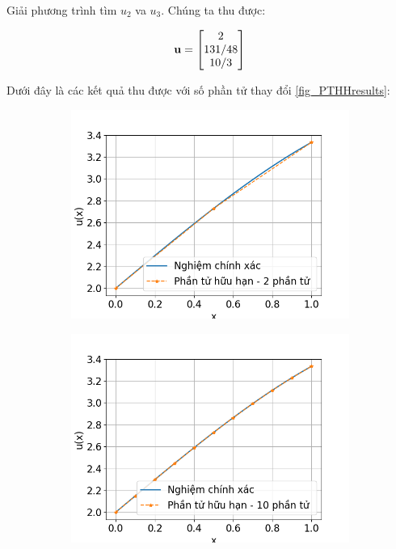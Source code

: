 Giải phương trình tìm $u_2$ va $u_3$. Chúng ta thu được:

\begin{equation}
    {\bf u} = \begin{bmatrix}
        2 \\ 131/48 \\ 10/3
    \end{bmatrix}
\end{equation}

Dưới đây là các kết quả thu được với số phần tử thay đổi \cref{fig_PTHHresults}:

\begin{figure}[htbp]
    \centering
    \begin{subfigure}[b]{0.3\linewidth}
        \centering
        \includegraphics[width=\linewidth]{Tuan6/figure/PTHH_2el.png}
        \caption{}
        \label{fig:PTHH_2el}
    \end{subfigure}\hfill
    \begin{subfigure}[b]{0.3\linewidth}
        \centering
        \includegraphics[width=\linewidth]{Tuan6/figure/PTHH_10el.png}

\end{subfigure}
\end{figure}
